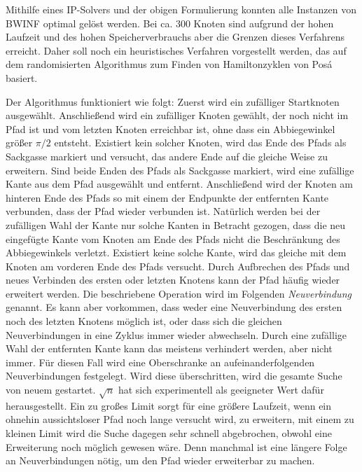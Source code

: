 \documentclass[a4paper, 10pt, ngerman]{article}
\begin{document}
Mithilfe eines IP-Solvers und der obigen Formulierung konnten alle Instanzen von BWINF optimal gelöst werden. Bei ca. 300 Knoten sind aufgrund der hohen Laufzeit und des hohen Speicherverbrauchs aber die Grenzen dieses Verfahrens erreicht. Daher soll noch ein heuristisches Verfahren vorgestellt werden, das auf dem randomisierten Algorithmus zum Finden von Hamiltonzyklen von Posá basiert.

Der Algorithmus funktioniert wie folgt: Zuerst wird ein zufälliger Startknoten ausgewählt. Anschließend wird ein zufälliger Knoten gewählt, der noch nicht im Pfad ist und vom letzten Knoten erreichbar ist, ohne dass ein Abbiegewinkel größer $\pi / 2$ entsteht. Existiert kein solcher Knoten, wird das Ende des Pfads als Sackgasse markiert und versucht, das andere Ende auf die gleiche Weise zu erweitern. Sind beide Enden des Pfads als Sackgasse markiert, wird eine zufällige Kante aus dem Pfad ausgewählt und entfernt. Anschließend wird der Knoten am hinteren Ende des Pfads so mit einem der Endpunkte der entfernten Kante verbunden, dass der Pfad wieder verbunden ist. Natürlich werden bei der zufälligen Wahl der Kante nur solche Kanten in Betracht gezogen, dass die neu eingefügte Kante vom Knoten am Ende des Pfads nicht die Beschränkung des Abbiegewinkels verletzt. Existiert keine solche Kante, wird das gleiche mit dem Knoten am vorderen Ende des Pfads versucht. Durch Aufbrechen des Pfads und neues Verbinden des ersten oder letzten Knotens kann der Pfad häufig wieder erweitert werden. Die beschriebene Operation wird im Folgenden \emph{Neuverbindung} genannt. Es kann aber vorkommen, dass weder eine Neuverbindung des ersten noch des letzten Knotens möglich ist, oder dass sich die gleichen Neuverbindungen in eine Zyklus immer wieder abwechseln. Durch eine zufällige Wahl der entfernten Kante kann das meistens verhindert werden, aber nicht immer. Für diesen Fall wird eine Oberschranke an aufeinanderfolgenden Neuverbindungen festgelegt. Wird diese überschritten, wird die gesamte Suche von neuem gestartet. $\sqrt n$ hat sich experimentell als geeigneter Wert dafür herausgestellt. Ein zu großes Limit sorgt für eine größere Laufzeit, wenn ein ohnehin aussichtsloser Pfad noch lange versucht wird, zu erweitern, mit einem zu kleinen Limit wird die Suche dagegen sehr schnell abgebrochen, obwohl eine Erweiterung noch möglich gewesen wäre. Denn manchmal ist eine längere Folge an Neuverbindungen nötig, um den Pfad wieder erweiterbar zu machen.
\end{document}
